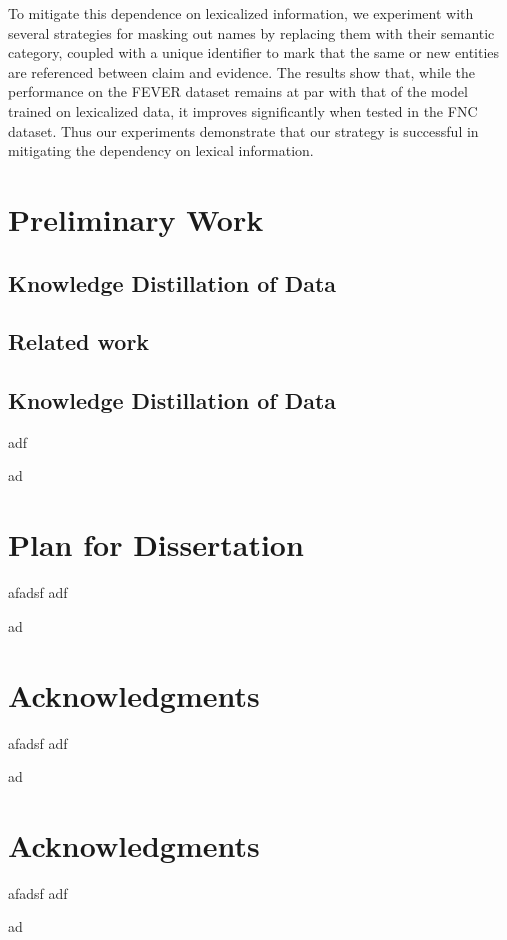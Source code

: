 \documentclass[conference,onecolumn]{IEEEtran}
\begin{document}
{}  To mitigate this dependence on lexicalized information, we experiment with several strategies for masking out names by replacing them with their semantic category, coupled with a unique identifier to mark that the same or new entities are referenced between claim and evidence. The results show that, while the performance on the FEVER dataset remains at par with that of the model trained on lexicalized data, it improves significantly when tested in the FNC dataset. Thus our experiments demonstrate that our strategy is successful in mitigating the dependency on lexical information.




\section*{Preliminary Work}
\subsection{Knowledge Distillation of Data}
\subsection{Related work}
\subsection{Knowledge Distillation of Data}
adf

ad
\section*{Plan for Dissertation}
afadsf
adf

ad
\section*{Acknowledgments}
afadsf
adf

ad
\section*{Acknowledgments}
afadsf
adf

ad




\balance
\begin{spacing}{0.88}


\end{spacing}

\end{document}
